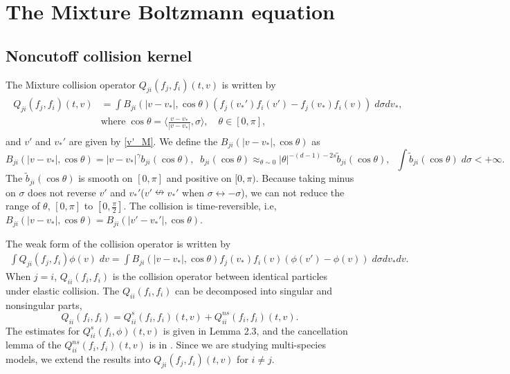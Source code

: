 \documentclass[reqno,10pt]{amsart}
\numberwithin{equation}{section}
\begin{document}
\section{The Mixture Boltzmann equation}
\subsection{Noncutoff collision kernel}
The Mixture collision operator $Q_{ji}(f_j,f_i)(t,v)$ is written by  
\begin{align} \label{Q_nc_M'}
\begin{split}
     Q_{ji}(f_j, f_i) (t,v) &= \int B_{ji}(|v-v_*|, \cos\theta)(f_j(v_*')f_i(v')-f_j(v_*)f_i(v)) \; d\sigma dv_*, \\ \quad &\text{where}\;\cos\theta = \langle\frac{v-v_*}{|v-v_*|}, \sigma\rangle, \quad \theta \in [0, \pi],
\end{split}
\end{align}
and $v'$ and $v_*'$ are given by \eqref{v'_M}. 
We define the $B_{ji}(|v-v_*|,\cos\theta)$ as
\begin{equation} \label{B_nc_M'}
    B_{ji}(|v-v_*|,\cos\theta)=|v-v_*|^{\gamma}b_{ji}(\cos\theta), \;\; b_{ji}(\cos\theta) \approx_{\theta \sim 0} |\theta|^{-(d-1)-2s} \tilde{b}_{ji}(\cos\theta), \;\;
    \int \tilde{b}_{ji}(\cos\theta) \;d\sigma < +\infty.
\end{equation}
The $\tilde{b}_{ji}(\cos\theta)$ is smooth on $[0,\pi]$ and positive on $[0,\pi).$ Because taking minus on ${\sigma}$ does not reverse $v'$ and $v_*'$($v' \nleftrightarrow v_*'$ when ${\sigma} \leftrightarrow -{\sigma}$), we can not reduce the range of $\theta$, $[0, \pi]$ to $[0, \frac{\pi}{2}]$. The collision is time-reversible, i.e, $B_{ji}(|v-v_*|,\cos\theta)=B_{ji}(|v'-v_*'|,\cos\theta)$. \vspace{3mm}

\noindent The weak form of the collision operator is written by 
\begin{align} \label{weak_nc_M}
    \int Q_{ji}(f_j,f_i)\phi(v) \;dv = \int B_{ji}(|v-v_*|,\cos\theta)f_j(v_*)f_i(v)(\phi(v')-\phi(v)) \;d\sigma dv_* dv.
\end{align} 
\noindent 
When $j=i$, $Q_{ii}(f_i,f_i)$ is the collision operator between identical particles under elastic collision. The $Q_{ii}(f_i,f_i)$ can be decomposed into singular and nonsingular parts,
\[
	Q_{ii}(f_i,f_i) = Q_{ii}^{s}(f_i,f_i)(t,v) + Q_{ii}^{ns}(f_i,f_i)(t,v).
\]
The estimates for $Q_{ii}^{s}(f_i,\phi)(t,v)$ is given in Lemma 2.3, \cite{IM2020} and the cancellation lemma of the $Q_{ii}^{ns}(f_i,f_i)(t,v)$ is in \cite{V2002}. Since we are studying multi-species models, we extend the results into $Q_{ji}(f_j,f_i)(t,v)$ for $i \neq j$. \\ %
\end{document}
